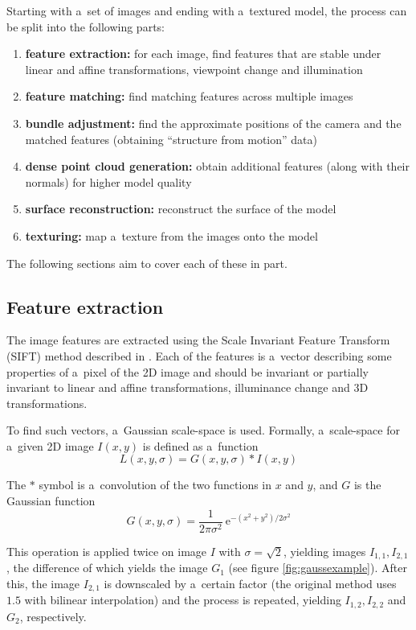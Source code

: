 Starting with a~set of images and ending with a~textured model, the process can be split into the following parts:

\begin{enumerate}
	\item \textbf{feature extraction:} for each image, find features that are stable under linear and affine transformations, viewpoint change and illumination
	\item \textbf{feature matching:} find matching features across multiple images
	\item \textbf{bundle adjustment:} find the approximate positions of the camera and the matched features (obtaining ``structure from motion'' data)
	\item \textbf{dense point cloud generation:} obtain additional features (along with their normals) for higher model quality
	\item \textbf{surface reconstruction:} reconstruct the surface of the model
	\item \textbf{texturing:} map a~texture from the images onto the model
\end{enumerate}

The following sections aim to cover each of these in part.

\subsection{Feature extraction} \label{ch:fext}
The image features are extracted using the Scale Invariant Feature Transform (SIFT) method described in \citet{lowe1999object,lowe2004distinctive}.
Each of the features is a~vector describing some properties of a~pixel of the 2D image and should be invariant or partially invariant to linear and affine transformations, illuminance change and 3D transformations.

To find such vectors, a~Gaussian scale-space is used.
Formally, a~scale-space for a~given 2D image $I(x, y)$ is defined as a~function
\begin{equation} L(x, y, \sigma) = G(x, y, \sigma) * I(x, y) \end{equation}

The $*$ symbol is a~convolution of the two functions in $x$ and $y$, and $G$ is the Gaussian function
\begin{equation}G(x, y, \sigma) = \frac{1}{2\pi \sigma^2}\ \mathrm{e}^{-(x^2 + y^2) / 2\sigma^2}\end{equation}

This operation is applied twice on image $I$ with $\sigma = \sqrt{2}$, yielding images $I_{1,1}, I_{2,1}$, the difference of which yields the image $G_1$ (see figure \ref{fig:gaussexample}).
After this, the image $I_{2,1}$ is downscaled by a~certain factor (the original method uses $1.5$ with bilinear interpolation) and the process is repeated, yielding $I_{1,2}, I_{2,2}$ and $G_2$, respectively.

